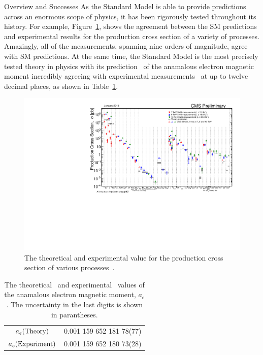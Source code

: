 \begin{section}{Overview and Successes}
As the Standard Model is able to provide predictions across an enormous scope of physics, it has been rigorously tested throughout its history.
For example, Figure~\ref{fig:sm_tests}, shows the agreement between the SM predictions and experimental results for the production cross section of a variety of processes.
Amazingly, all of the measurements, spanning nine orders of magnitude, agree with SM predictions.
At the same time, the Standard Model is the most precisely tested theory in physics with its prediction~\cite{PhysRevLett.109.111807} of the anamalous electron magnetic moment incredibly agreeing with experimental measurements~\cite{PhysRevLett.100.120801,PhysRevA.83.052122} at up to twelve decimal places, as shown in Table~\ref{tab:ae_values}.

\begin{figure}[tbp!]
\begin{center}
\includegraphics[angle=0,width=0.95\columnwidth]{fig/sm_tests.pdf}
\end{center}
\caption{The theoretical and experimental value for the production cross section of various processes~\cite{sm_tests}.}
\label{fig:sm_tests}
\end{figure}

\begin{table}[tbp!]
\centering
\begin{tabular}{ |c|c| }
\hline
$a_e \mathrm{(Theory)}$      &  0.001 159 652 181 78(77) \\
$a_e \mathrm{(Experiment)}$  &  0.001 159 652 180 73(28) \\
\hline
\end{tabular}
\caption{The theoretical~\cite{PhysRevLett.109.111807} and experimental~\cite{PhysRevLett.100.120801,PhysRevA.83.052122} values of the anamalous electron magnetic moment, $a_e$.
The uncertainty in the last digits is shown in parantheses.}
\label{tab:ae_values}
\end{table}

\end{section}


